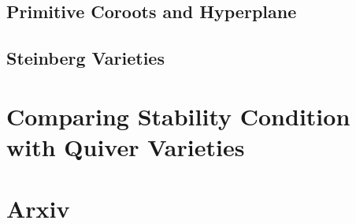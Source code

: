\documentclass[b5paper]{article}
\begin{document}
\subsection{Primitive Coroots and Hyperplane}
\subsection{Steinberg Varieties}

\section{Comparing Stability Condition with Quiver Varieties}
\section{Arxiv}
\end{document}
